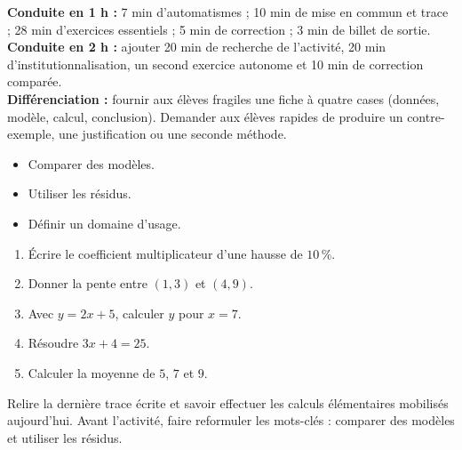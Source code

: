 \ifprof
\begin{methode}
\textbf{Conduite en 1 h :} 7 min d'automatismes ; 10 min de mise en commun et trace ; 28 min d'exercices essentiels ; 5 min de correction ; 3 min de billet de sortie.\\
\textbf{Conduite en 2 h :} ajouter 20 min de recherche de l'activité, 20 min d'institutionnalisation, un second exercice autonome et 10 min de correction comparée.\\
\textbf{Différenciation :} fournir aux élèves fragiles une fiche à quatre cases (données, modèle, calcul, conclusion). Demander aux élèves rapides de produire un contre-exemple, une justification ou une seconde méthode.
\end{methode}
\fi
{}
\begin{objectifs}\begin{itemize}\item Comparer des modèles.\item Utiliser les résidus.\item Définir un domaine d'usage.\end{itemize}\end{objectifs}
\begin{automatismes}\begin{enumerate}\item Écrire le coefficient multiplicateur d'une hausse de $10\,\%$. \item Donner la pente entre $(1,3)$ et $(4,9)$. \item Avec $y=2x+5$, calculer $y$ pour $x=7$. \item Résoudre $3x+4=25$. \item Calculer la moyenne de $5$, $7$ et $9$. \end{enumerate}\end{automatismes}
\begin{prerequis}Relire la dernière trace écrite et savoir effectuer les calculs élémentaires mobilisés aujourd'hui. Avant l'activité, faire reformuler les mots-clés : comparer des modèles et utiliser les résidus.\end{prerequis}

